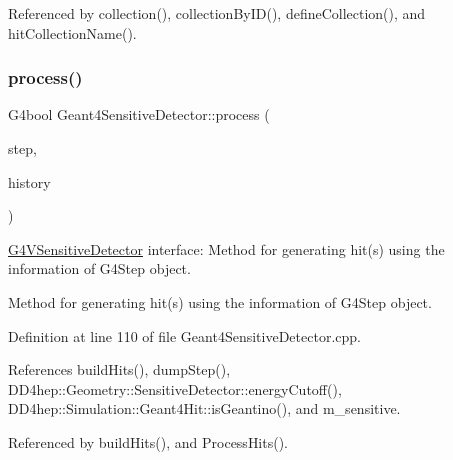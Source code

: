 Referenced by collection(), collection\+By\+I\+D(), define\+Collection(), and hit\+Collection\+Name().

\hypertarget{class_d_d4hep_1_1_simulation_1_1_geant4_sensitive_detector_aea5cd9b90bf1102dcf9e027f618cabe6}{}\label{class_d_d4hep_1_1_simulation_1_1_geant4_sensitive_detector_aea5cd9b90bf1102dcf9e027f618cabe6} 
\subsubsection{\texorpdfstring{process()}{process()}}
{\footnotesize\ttfamily G4bool Geant4\+Sensitive\+Detector\+::process (\begin{DoxyParamCaption}\item[{G4\+Step $\ast$}]{step,  }\item[{G4\+Touchable\+History $\ast$}]{history }\end{DoxyParamCaption})\hspace{0.3cm}{\ttfamily [virtual]}}



\hyperlink{class_g4_v_sensitive_detector}{G4\+V\+Sensitive\+Detector} interface\+: Method for generating hit(s) using the information of G4\+Step object. 

Method for generating hit(s) using the information of G4\+Step object. 

Definition at line 110 of file Geant4\+Sensitive\+Detector.\+cpp.



References build\+Hits(), dump\+Step(), D\+D4hep\+::\+Geometry\+::\+Sensitive\+Detector\+::energy\+Cutoff(), D\+D4hep\+::\+Simulation\+::\+Geant4\+Hit\+::is\+Geantino(), and m\+\_\+sensitive.



Referenced by build\+Hits(), and Process\+Hits().

\hypertarget{class_d_d4hep_1_1_simulation_1_1_geant4_sensitive_detector_ac889694c4406ea089f3172b73da49134}{}\label{class_d_d4hep_1_1_simulation_1_1_geant4_sensitive_detector_ac889694c4406ea089f3172b73da49134} 
